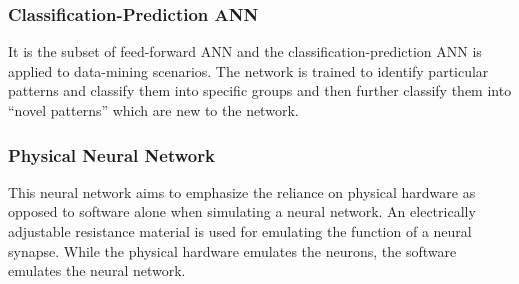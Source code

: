 \subsubsection{Classification-Prediction ANN}
It is the subset of feed-forward ANN and the classification-prediction ANN is applied to data-mining scenarios. The network is trained to identify particular patterns and classify them into specific groups and then further classify them into “novel patterns” which are new to the network.
\subsubsection{Physical Neural Network}
This neural network aims to emphasize the reliance on physical hardware as opposed to software alone when simulating a neural network. An electrically adjustable resistance material is used for emulating the function of a neural synapse. While the physical hardware emulates the neurons, the software emulates the neural network.

